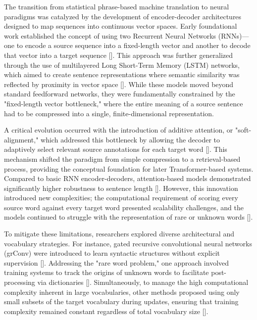 \documentclass[11pt]{article}
\begin{document}
The transition from statistical phrase-based machine translation to neural paradigms was catalyzed by the development of encoder-decoder architectures designed to map sequences into continuous vector spaces. Early foundational work established the concept of using two Recurrent Neural Networks (RNNs)—one to encode a source sequence into a fixed-length vector and another to decode that vector into a target sequence [\citep{1406.1078}]. This approach was further generalized through the use of multilayered Long Short-Term Memory (LSTM) networks, which aimed to create sentence representations where semantic similarity was reflected by proximity in vector space [\citep{1409.3215}]. While these models moved beyond standard feedforward networks, they were fundamentally constrained by the "fixed-length vector bottleneck," where the entire meaning of a source sentence had to be compressed into a single, finite-dimensional representation.

A critical evolution occurred with the introduction of additive attention, or "soft-alignment," which addressed this bottleneck by allowing the decoder to adaptively select relevant source annotations for each target word [\citep{1409.0473}]. This mechanism shifted the paradigm from simple compression to a retrieval-based process, providing the conceptual foundation for later Transformer-based systems. Compared to basic RNN encoder-decoders, attention-based models demonstrated significantly higher robustness to sentence length [\citep{1409.0473}]. However, this innovation introduced new complexities; the computational requirement of scoring every source word against every target word presented scalability challenges, and the models continued to struggle with the representation of rare or unknown words [\citep{1409.0473}].

To mitigate these limitations, researchers explored diverse architectural and vocabulary strategies. For instance, gated recursive convolutional neural networks (grConv) were introduced to learn syntactic structures without explicit supervision [\citep{1409.1259}]. Addressing the "rare word problem," one approach involved training systems to track the origins of unknown words to facilitate post-processing via dictionaries [\citep{1410.8206}]. Simultaneously, to manage the high computational complexity inherent in large vocabularies, other methods proposed using only small subsets of the target vocabulary during updates, ensuring that training complexity remained constant regardless of total vocabulary size [\citep{1412.2007}].
\end{document}

